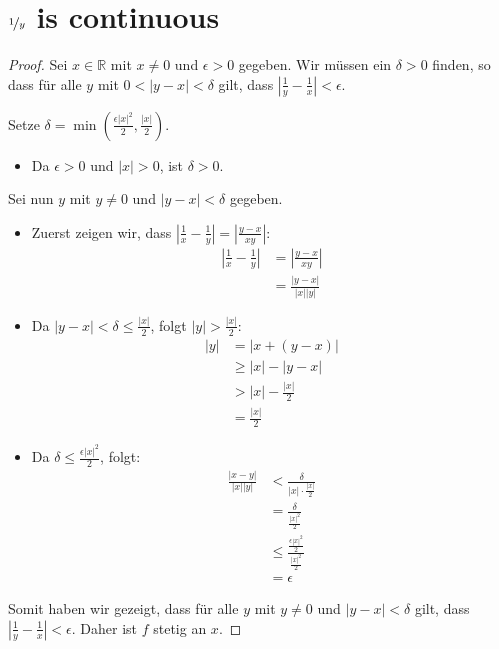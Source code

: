 \section{$\nicefrac{1}{y}$ is continuous}


\begin{proof}
Sei \( x \in \mathbb{R} \) mit \( x \neq 0 \) und \( \epsilon > 0 \) gegeben. Wir müssen ein \( \delta > 0 \) finden, so dass für alle \( y \) mit \( 0 < |y - x| < \delta \) gilt, dass \( \left| \frac{1}{y} - \frac{1}{x} \right| < \epsilon \).

Setze \( \delta = \min \left( \frac{\epsilon |x|^2}{2}, \frac{|x|}{2} \right) \).

\begin{itemize}
    \item Da \( \epsilon > 0 \) und \( |x| > 0 \), ist \( \delta > 0 \).
\end{itemize}

Sei nun \( y \) mit \( y \neq 0 \) und \( |y - x| < \delta \) gegeben.

\begin{itemize}
    \item Zuerst zeigen wir, dass \( \left| \frac{1}{x} - \frac{1}{y} \right| = \left| \frac{y - x}{xy} \right| \):
    \begin{align*}
    \left| \frac{1}{x} - \frac{1}{y} \right| &= \left| \frac{y - x}{xy} \right| \\
    &= \frac{|y - x|}{|x||y|}
    \end{align*}

    \item Da \( |y - x| < \delta \leq \frac{|x|}{2} \), folgt \( |y| > \frac{|x|}{2} \):
    \begin{align*}
    |y| &= |x + (y - x)| \\
    &\geq |x| - |y - x| \\
    &> |x| - \frac{|x|}{2} \\
    &= \frac{|x|}{2}
    \end{align*}

    \item Da \( \delta \leq \frac{\epsilon |x|^2}{2} \), folgt:
    \begin{align*}
    \frac{|x - y|}{|x||y|} &< \frac{\delta}{|x| \cdot \frac{|x|}{2}} \\
    &= \frac{\delta}{\frac{|x|^2}{2}} \\
    &\leq \frac{\frac{\epsilon |x|^2}{2}}{\frac{|x|^2}{2}} \\
    &= \epsilon
    \end{align*}
\end{itemize}

Somit haben wir gezeigt, dass für alle \( y \) mit \( y \neq 0 \) und \( |y - x| < \delta \) gilt, dass \( \left| \frac{1}{y} - \frac{1}{x} \right| < \epsilon \). Daher ist \( f \) stetig an \( x \).
\end{proof}
